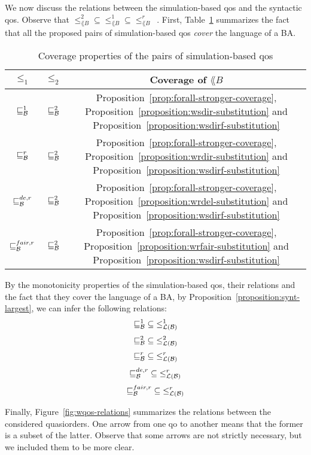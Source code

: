 We now discuss the relations between the simulation-based qos and the
syntactic qos.
Observe that $\mathord{\leq^2_{\lang{B}}} \subseteq \mathord{\leq^1_{\lang{B}}} \subseteq \mathord{\leq^r_{\lang{B}}}$~\cite{ganty2020omegalang}.
First, Table~\ref{table:coverage} summarizes the fact that all the proposed
pairs of simulation-based qos \emph{cover} the language of a BA.

\begin{table}[h]
\centering
\begin{tabular}{ c | c | c }
$\leq_1$ & $\leq_2$ & \textbf{Coverage of $\lang{B}$} \\
\hline
\hline
$\sqsubseteq^1_{\mathcal{B}}$ & $\sqsubseteq_{\mathcal{B}}^{2}$   & Proposition~\ref{prop:forall-stronger-coverage}, Proposition~\ref{proposition:wsdir-substitution}  and Proposition~\ref{proposition:wsdirf-substitution} \\
$\sqsubseteq_{\mathcal{B}}^r$ & $\sqsubseteq_{\mathcal{B}}^{2}$   & Proposition~\ref{prop:forall-stronger-coverage}, Proposition~\ref{proposition:wrdir-substitution}  and Proposition~\ref{proposition:wsdirf-substitution} \\
$\sqsubseteq_{\mathcal{B}}^{de,r}$ & $\sqsubseteq_{\mathcal{B}}^{2}$   & Proposition~\ref{prop:forall-stronger-coverage}, Proposition~\ref{proposition:wrdel-substitution}  and Proposition~\ref{proposition:wsdirf-substitution} \\
$\sqsubseteq_{\mathcal{B}}^{fair,r}$ &  $\sqsubseteq_{\mathcal{B}}^{2}$ & Proposition~\ref{prop:forall-stronger-coverage}, Proposition~\ref{proposition:wrfair-substitution} and Proposition~\ref{proposition:wsdirf-substitution} \\
\end{tabular}
\caption{Coverage properties of the pairs of simulation-based qos}
\label{table:coverage}
\end{table}

By the monotonicity properties of the simulation-based qos,
their relations and the fact that they cover the language of a BA,
by Proposition~\ref{proposition:synt-largest}, we can infer the
following relations:
\[ \mathord{\sqsubseteq^1_{\mathcal{B}}} \subseteq \mathord{\leq^1_{\mathcal{L}(\mathcal{B})}} \]
\[ \mathord{\sqsubseteq_{\mathcal{B}}^{2}} \subseteq \mathord{\leq^2_{\mathcal{L}(\mathcal{B})}} \]
\[ \mathord{\sqsubseteq_{\mathcal{B}}^r} \subseteq \mathord{\leq^r_{\mathcal{L}(\mathcal{B})}} \]
\[ \mathord{\sqsubseteq_{\mathcal{B}}^{de,r}} \subseteq \mathord{\leq^r_{\mathcal{L}(\mathcal{B})}} \]
\[ \mathord{\sqsubseteq_{\mathcal{B}}^{fair,r}} \subseteq \mathord{\leq^r_{\mathcal{L}(\mathcal{B})}} \]

Finally, Figure~\ref{fig:wqos-relations} summarizes the relations between
the considered quasiorders.
One arrow from one qo to another means that the former is a subset
of the latter.
Observe that some arrows are not strictly necessary, but we included them to be
more clear.


